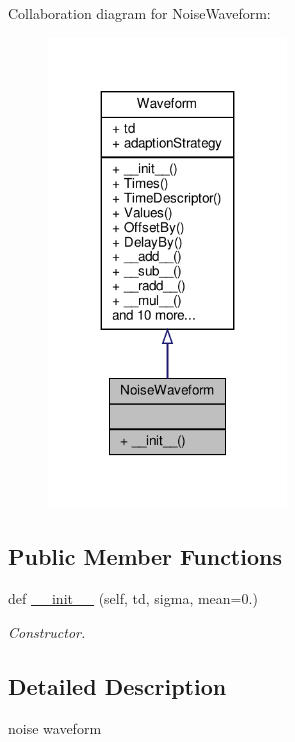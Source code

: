 Collaboration diagram for Noise\+Waveform\+:\nopagebreak
\begin{figure}[H]
\begin{center}
\leavevmode
\includegraphics[width=179pt]{classSignalIntegrity_1_1TimeDomain_1_1Waveform_1_1NoiseWaveform_1_1NoiseWaveform__coll__graph}
\end{center}
\end{figure}
\subsection*{Public Member Functions}
\begin{DoxyCompactItemize}
\item 
def \hyperlink{classSignalIntegrity_1_1TimeDomain_1_1Waveform_1_1NoiseWaveform_1_1NoiseWaveform_ae21c6cd231683be0c411972c12609995}{\+\_\+\+\_\+init\+\_\+\+\_\+} (self, td, sigma, mean=0.)
\begin{DoxyCompactList}\small\item\em Constructor. \end{DoxyCompactList}\end{DoxyCompactItemize}


\subsection{Detailed Description}
noise waveform 

